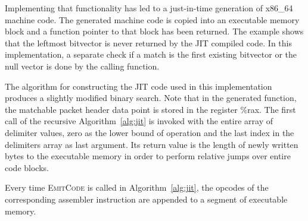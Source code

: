 \documentclass[conference]{IEEEtran}
\begin{document}

Implementing that functionality has led to a just-in-time generation of x86\_64 machine code.
The generated machine code is copied into an executable memory block and a function pointer to that block has been returned.
The example shows that the leftmost bitvector is never returned by the JIT compiled code.
In this implementation, a separate check if a match is the first existing bitvector or the null 
vector is done by the calling function.

The algorithm for constructing the JIT code used in this implementation produces a slightly modified binary search.
Note that in the generated function, the matchable packet header data point is stored in the register \textsf{\%rax}.
The first call of the recursive Algorithm~\ref{alg:jit} is invoked with the entire array of delimiter values,
zero as the lower bound of operation and the last index in the delimiters array as last argument.
Its return value is the length of newly written bytes to the executable memory in order to perform relative jumps over entire code blocks.

Every time \textsc{EmitCode} is called in Algorithm~\ref{alg:jit}, the opcodes 
of the corresponding assembler instruction are appended to a segment of executable memory.
\end{document}
